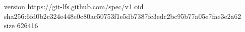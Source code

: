 version https://git-lfs.github.com/spec/v1
oid sha256:6fd0b2c324e448e0c80ac50753f1e5db7387fc3edc2bc95b77a05e7fae3e2a62
size 626416
